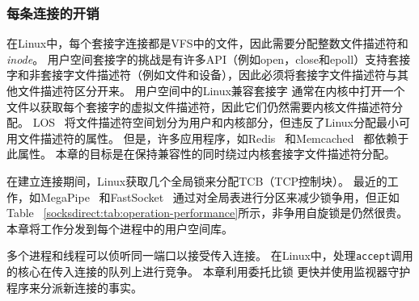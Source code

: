 \subsubsection{每条连接的开销}
\label{socksdirect:subsec:per-connection-overhead}

在Linux中，每个套接字连接都是VFS中的文件，因此需要分配整数文件描述符和\emph {inode}。
用户空间套接字的挑战是有许多API（例如open，close和epoll）支持套接字和非套接字文件描述符（例如文件和设备），因此必须将套接字文件描述符与其他文件描述符区分开来。
用户空间中的Linux兼容套接字 \cite {libvma,rsockets}通常在内核中打开一个文件以获取每个套接字的虚拟文件描述符，因此它们仍然需要内核文件描述符分配。
LOS~ \cite {huang2017high}将文件描述符空间划分为用户和内核部分，但违反了Linux分配最小可用文件描述符的属性。
但是，许多应用程序，如Redis~ \cite {redis}和Memcached~ \cite {memcached}都依赖于此属性。
本章的目标是在保持兼容性的同时绕过内核套接字文件描述符分配。

在建立连接期间，Linux获取几个全局锁来分配TCB（TCP控制块）。
最近的工作，如MegaPipe~ \cite {han2012megapipe}和FastSocket~ \cite {lin2016scalable}通过对全局表进行分区来减少锁争用，但正如Table~ \ref {socksdirect:tab:operation-performance}所示，非争用自旋锁是仍然很贵。
本章将工作分发到每个进程中的用户空间库\libipc {}。

多个进程和线程可以侦听同一端口以接受传入连接。
在Linux中，处理\texttt {accept}调用的核心在传入连接的队列上进行竞争。
本章利用委托比锁 \cite {roghanchi2017ffwd}更快并使用监视器守护程序来分派新连接的事实。





